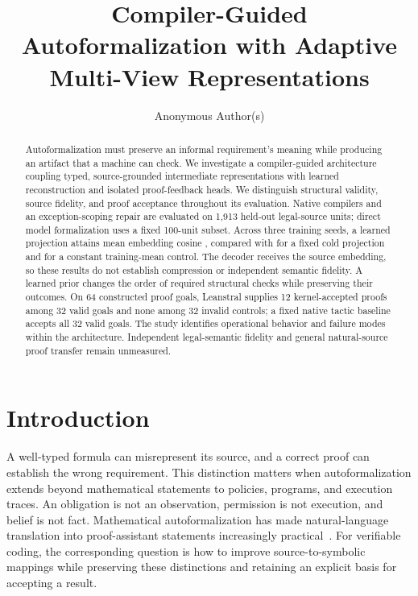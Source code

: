 \documentclass{article}
\title{Compiler-Guided Autoformalization with Adaptive\\Multi-View Representations}
\author{Anonymous Author(s)}
\begin{document}
\maketitle


\begin{abstract}
Autoformalization must preserve an informal requirement's meaning while producing an artifact that a machine can check. We investigate a compiler-guided architecture coupling typed, source-grounded intermediate representations with learned reconstruction and isolated proof-feedback heads. We distinguish structural validity, source fidelity, and proof acceptance throughout its evaluation. Native compilers and an exception-scoping repair are evaluated on 1,913 held-out legal-source units; direct model formalization uses a fixed 100-unit subset. Across three training seeds, a learned projection attains mean embedding cosine \AETrainedCosine{}, compared with \AEColdCosine{} for a fixed cold projection and \AETrainingMeanCosine{} for a constant training-mean control. The decoder receives the source embedding, so these results do not establish compression or independent semantic fidelity. A learned prior changes the order of required structural checks while preserving their outcomes. On 64 constructed proof goals, Leanstral supplies 12 kernel-accepted proofs among 32 valid goals and none among 32 invalid controls; a fixed native tactic baseline accepts all 32 valid goals. The study identifies operational behavior and failure modes within the architecture. Independent legal-semantic fidelity and general natural-source proof transfer remain unmeasured.
\end{abstract}

\section{Introduction}
A well-typed formula can misrepresent its source, and a correct proof can establish the wrong requirement. This distinction matters when autoformalization extends beyond mathematical statements to policies, programs, and execution traces. An obligation is not an observation, permission is not execution, and belief is not fact. Mathematical autoformalization has made natural-language translation into proof-assistant statements increasingly practical~\citep{wu2022autoformalization,azerbayev2023proofnet,jiang2024multilanguage}. For verifiable coding, the corresponding question is how to improve source-to-symbolic mappings while preserving these distinctions and retaining an explicit basis for accepting a result.
\end{document}
